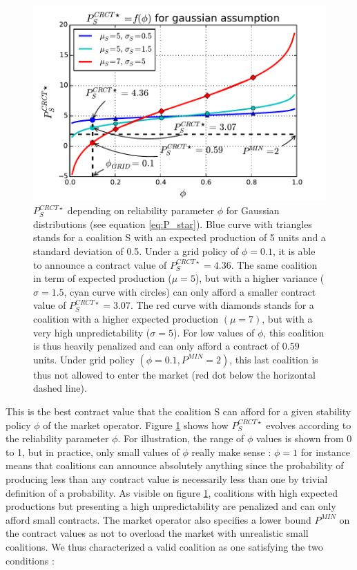 \documentclass[journal]{IEEEtran}
\begin{document}
\begin{figure}
	\begin{center}
		\includegraphics[scale=.46]{./figs/figure_1}
		\caption{{\footnotesize $ P_{S}^{CRCT \star} $ depending on reliability parameter $ \phi $ for Gaussian distributions (see equation \ref{eq:P_star}). Blue curve with triangles stands for a coalition S with an expected production of 5 units and a standard deviation of 0.5. Under a grid policy of $ \phi = 0.1 $, it is able to announce a contract value of $ P_{S}^{CRCT \star} = 4.36 $. The same coalition in term of expected production ($\mu = 5 $), but with a higher variance ($ \sigma = 1.5 $, cyan curve with circles) can only afford a smaller contract value of $ P_{S}^{CRCT \star} = 3.07 $. The red curve with diamonds stands for a coalition with a higher expected production $(\mu = 7)$, but with a very high unpredictability ($ \sigma = 5 $). For low values of $ \phi $, this coalition is thus heavily penalized and can only afford a contract of $ 0.59 $ units. Under grid policy $ (\phi = 0.1, P^{MIN} = 2) $, this last coalition is thus not allowed to enter the market (red dot below the horizontal dashed line).} }
		\label{fig:Gaussian}
	\end{center}
\end{figure}

This is the best contract value that the coalition S can afford for a given stability policy $\phi$ of the market operator. Figure \ref{fig:Gaussian} shows how $ P_{S}^{CRCT \star} $ evolves according to the reliability parameter $ \phi $. For illustration, the range of $ \phi $ values is shown from 0 to 1, but in practice, only small values of $ \phi $ really make sense : $ \phi = 1 $ for instance means that coalitions can announce absolutely anything since the probability of producing less than any contract value is necessarily less than one by trivial definition of a probability. As visible on figure \ref{fig:Gaussian}, coalitions with high expected productions but presenting a high unpredictability are penalized and can only afford small contracts. The market operator also specifies a lower bound $ P^{MIN} $ on the contract values as not to overload the market with unrealistic small coalitions. We thus characterized a valid coalition as one satisfying the two conditions :
\end{document}
